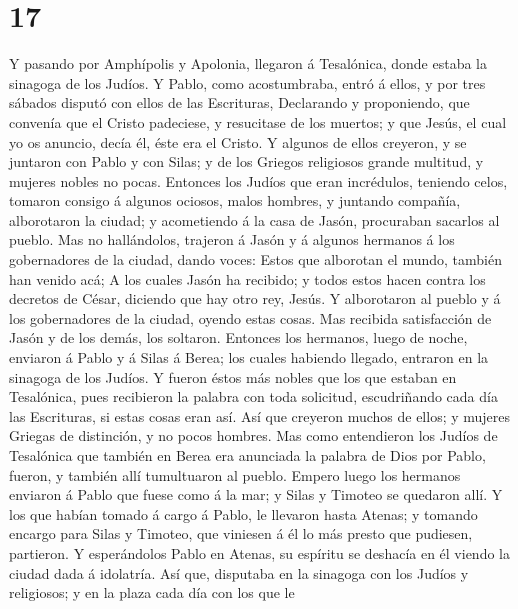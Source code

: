 \hypertarget{section-16}{%
\section{17}\label{section-16}}

 Y pasando por Amphípolis y Apolonia, llegaron á Tesalónica,
donde estaba la sinagoga de los Judíos.  Y Pablo, como
acostumbraba, entró á ellos, y por tres sábados disputó con ellos de las
Escrituras,  Declarando y proponiendo, que convenía que el
Cristo padeciese, y resucitase de los muertos; y que Jesús, el cual yo
os anuncio, decía él, éste era el Cristo.  Y algunos de
ellos creyeron, y se juntaron con Pablo y con Silas; y de los Griegos
religiosos grande multitud, y mujeres nobles no pocas. 
Entonces los Judíos que eran incrédulos, teniendo celos, tomaron consigo
á algunos ociosos, malos hombres, y juntando compañía, alborotaron la
ciudad; y acometiendo á la casa de Jasón, procuraban sacarlos al pueblo.
 Mas no hallándolos, trajeron á Jasón y á algunos hermanos á
los gobernadores de la ciudad, dando voces: Estos que alborotan el
mundo, también han venido acá;  A los cuales Jasón ha
recibido; y todos estos hacen contra los decretos de César, diciendo que
hay otro rey, Jesús.  Y alborotaron al pueblo y á los
gobernadores de la ciudad, oyendo estas cosas.  Mas recibida
satisfacción de Jasón y de los demás, los soltaron. 
Entonces los hermanos, luego de noche, enviaron á Pablo y á Silas á
Berea; los cuales habiendo llegado, entraron en la sinagoga de los
Judíos.  Y fueron éstos más nobles que los que estaban en
Tesalónica, pues recibieron la palabra con toda solicitud, escudriñando
cada día las Escrituras, si estas cosas eran así.  Así que
creyeron muchos de ellos; y mujeres Griegas de distinción, y no pocos
hombres.  Mas como entendieron los Judíos de Tesalónica que
también en Berea era anunciada la palabra de Dios por Pablo, fueron, y
también allí tumultuaron al pueblo.  Empero luego los
hermanos enviaron á Pablo que fuese como á la mar; y Silas y Timoteo se
quedaron allí.  Y los que habían tomado á cargo á Pablo, le
llevaron hasta Atenas; y tomando encargo para Silas y Timoteo, que
viniesen á él lo más presto que pudiesen, partieron.  Y
esperándolos Pablo en Atenas, su espíritu se deshacía en él viendo la
ciudad dada á idolatría.  Así que, disputaba en la sinagoga
con los Judíos y religiosos; y en la plaza cada día con los que le
